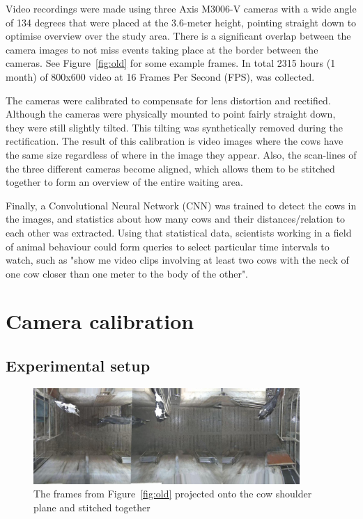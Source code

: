 \documentclass{IET}
\begin{document}
Video recordings were made using three Axis M3006-V cameras with a wide angle of 134 degrees that were placed at the 3.6-meter height, pointing straight down to optimise overview over the study area. There is a significant overlap between the camera images to not miss events taking place at the border between the cameras. See Figure~\ref{fig:old} for some example frames. In total 2315 hours (1 month) of 800x600 video at 16 Frames Per Second (FPS), was collected.

The cameras were calibrated to compensate for lens distortion and rectified. Although the cameras were physically mounted to point fairly straight down, they were still slightly tilted. This tilting was synthetically removed during the rectification. The result of this calibration is video images where the cows have the same size regardless of where in the image they appear. Also, the scan-lines of the three different cameras become aligned, which allows them to be stitched together to form an overview of the entire waiting area.

Finally, a Convolutional Neural Network (CNN)  was trained to detect the cows in the images, and statistics about how many cows and their distances/relation to each other was extracted. Using that statistical data, scientists working in a field of animal behaviour could form queries to select particular time intervals to watch, such as "show me video clips involving at least two cows with the neck of one cow closer than one meter to the body of the other".


\section{Camera calibration}

\subsection{Experimental setup}

\begin{figure}[tb]
\begin{center}
  \includegraphics[width=0.9\textwidth]{full.jpg}
\end{center}
  \caption{The frames from Figure~\ref{fig:old} projected onto the cow shoulder plane and stitched together}
  \label{fig:stitch}
\end{figure}
\end{document}
